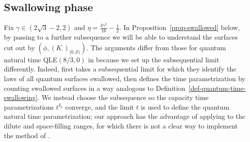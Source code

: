 \documentclass[a4paper]{article}
\numberwithin{equation}{section}
\newcommand{\qduration}{\mathcal{S}}
\theoremstyle{remark}
\numberwithin{equation}{section}
\begin{document}
\subsection{Swallowing phase}
Fix $\gamma \in (2\sqrt3 - 2,2)$ and $\eta = \frac{3\gamma^2}{16} - \frac12$. In Proposition~\ref{prop-swallowed} below, by passing to a further subsequence we will be able to understand the surfaces cut out by $(\phi, (K_\cdot)_{[0,\qduration)})$. The arguments differ from those for quantum natural time QLE$(8/3,0)$ in  \cite[Section 6]{ms-equivalence} because we set up the subsequential limit differently. Indeed,  \cite{ms-equivalence} first takes a subsequential limit for which they identify the laws of all quantum surfaces swallowed, then defines the time parametrization by counting swallowed surfaces in a way analogous to Definition~\ref{def-quantum-time-swallowing}. We instead choose the subsequence so the capacity time parametrizations $t^{\delta_k}$ converge, and the limit $t$ is used to define the quantum natural time parametrization; our approach has the advantage of applying to the dilute and space-filling ranges, for which there is not a clear way to implement the method of \cite{ms-equivalence}.  
\end{document}

